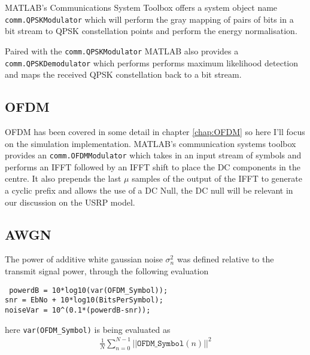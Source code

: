 MATLAB's Communications System Toolbox offers %
a system object name \texttt{comm.QPSKModulator} %
\cite{QPSKModulator} which %
will perform the gray mapping of pairs of bits in a %
bit stream to QPSK constellation points and perform %
the energy normalisation.

Paired with the \texttt{comm.QPSKModulator} MATLAB also %
provides a \texttt{comm.QPSKDemodulator} \cite{QPSKDemodulator} %
which performs %
performs maximum likelihood detection and maps %
the received QPSK constellation back to a bit %
stream.

\subsection{OFDM}

OFDM has been covered in some detail in chapter %
\ref{chap:OFDM} so here I'll focus on the simulation %
implementation. MATLAB's communication systems %
toolbox provides an \texttt{comm.OFDMModulator} %
\cite{OFDMModulator} which %
takes in an input stream of symbols and performs %
an IFFT followed by an IFFT shift to place the DC %
components in the centre. It also prepends the %
last $\mu$ samples of the output of the IFFT to %
generate a cyclic prefix and allows the use %
of a DC Null, the DC null will be relevant in %
our discussion on the USRP model.

\subsection{AWGN}

The power of additive white gaussian noise $\sigma_n^{2}$ %
was defined relative to the transmit signal power, through %
the following evaluation

\texttt{%
powerdB = 10*log10(var(OFDM\_Symbol));\\%
snr = EbNo + 10*log10(BitsPerSymbol);\\%
noiseVar = 10\textasciicircum(0.1*(powerdB-snr));}

here \texttt{var(OFDM\_Symbol)} is being evaluated %
as 
\begin{align}
	\frac{1}{N} %
	\sum_{n=0}^{N-1} \lvert\lvert \texttt{OFDM\_Symbol}%
	(n) \rvert\rvert^{2}
\end{align}

